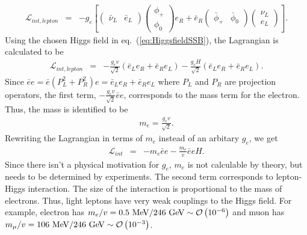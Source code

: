 \begin{eqnarray} 
\mathcal{L}_{int, lepton} 
&=& 
-g_e \left[ 
\left(  \begin{array}{cc} \bar{\nu}_L & \bar{e}_L \end{array} \right)
\left(  \begin{array}{c} \phi_+  \\ \phi_0 \end{array} \right) e_R
+ 
\bar{e}_R
\left(  \begin{array}{cc} \bar{\phi}_+  & \bar{\phi}_0 \end{array} \right) 
\left(  \begin{array}{c} \nu_L \\ e_L \end{array} \right)
\right].
\end{eqnarray} 
Using the chosen Higgs field in eq.~(\ref{eq:HiggsfieldSSB}), 
the Lagrangian is calculated to be 
\begin{eqnarray} 
\mathcal{L}_{int, lepton} 
&=& 
-\frac{g_e v}{\sqrt{2}}\left( \bar{e}_L e_R + \bar{e}_R e_L \right)  
-\frac{g_e H}{\sqrt{2}}\left( \bar{e}_L e_R + \bar{e}_R e_L \right). 
\end{eqnarray}
Since $\bar{e}e = \bar{e}(P_L^2+P_R^2)e = \bar{e}_L e_R + \bar{e}_R e_L$ where
$P_L$ and $P_R$ are projection operators, the first term, 
$\displaystyle -\frac{g_e v}{\sqrt{2}} \bar{e}e$, corresponds to the mass term for the electron. 
Thus, the mass is identified to be 
\begin{eqnarray} 
m_e = \frac{g_e v}{\sqrt{2}}.
\end{eqnarray} 
Rewriting the Lagrangian in terms of $m_e$ instead of an arbitary $g_e$, we get 
\begin{eqnarray} 
\mathcal{L}_{int} 
&=& 
- m_e \bar{e}e  -\frac{m_e}{v} \bar{e}e H. 
\end{eqnarray} 
Since there isn't a physical motivation for $g_e$, $m_e$ is not calculable 
by theory, but needs to be determined by experiments. The second term 
corresponds to lepton-Higgs interaction. The size of the interaction 
is proportional to the mass of electrons. Thus, light leptons have very 
weak couplings to the Higgs field. For example, electron has 
$m_e/v = 0.5~\mathrm{Me\kern -0.1em V}/246~\mathrm{Ge\kern -0.1em V} \sim \mathcal{O}\left(10^{-6}\right)$
and muon has $m_\mu / v = 106~\mathrm{Me\kern -0.1em V}/246~\mathrm{Ge\kern -0.1em V} \sim \mathcal{O}\left(10^{-3}\right)$.

